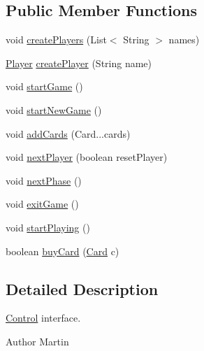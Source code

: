 \subsection*{\-Public \-Member \-Functions}
\begin{DoxyCompactItemize}
\item 
void \hyperlink{interfacedominion_1_1control_1_1Control_ab56d2c677d28c1057d778e8c612fca32}{create\-Players} (\-List$<$ \-String $>$ names)
\item 
\hyperlink{interfacedominion_1_1model_1_1Player}{\-Player} \hyperlink{interfacedominion_1_1control_1_1Control_aba420bb2b223beb828a7bcf1158abc57}{create\-Player} (\-String name)
\item 
void \hyperlink{interfacedominion_1_1control_1_1Control_a4ce0cf943175932b2b2e0df91cb55307}{start\-Game} ()
\item 
void \hyperlink{interfacedominion_1_1control_1_1Control_a8d3da0166736b7f786925d6cdca56ec0}{start\-New\-Game} ()
\item 
void \hyperlink{interfacedominion_1_1control_1_1Control_af4dd1bfacfdbd6c4d9b60aed99f515e3}{add\-Cards} (\-Card...\-cards)
\item 
void \hyperlink{interfacedominion_1_1control_1_1Control_a897322aa99b10418425b5ce0f799d17e}{next\-Player} (boolean reset\-Player)
\item 
void \hyperlink{interfacedominion_1_1control_1_1Control_a630ad524600d28db3b01c0cc3407c9f9}{next\-Phase} ()
\item 
void \hyperlink{interfacedominion_1_1control_1_1Control_a7f51535a44addff1d895149be71b8c89}{exit\-Game} ()
\item 
void \hyperlink{interfacedominion_1_1control_1_1Control_aa98523f28b63d0b7d90b398a3a891594}{start\-Playing} ()
\item 
boolean \hyperlink{interfacedominion_1_1control_1_1Control_a71598562ac3a8ff3cb67bf968142f5f7}{buy\-Card} (\hyperlink{interfacedominion_1_1model_1_1cards_1_1Card}{\-Card} c)
\end{DoxyCompactItemize}


\subsection{\-Detailed \-Description}
\hyperlink{interfacedominion_1_1control_1_1Control}{\-Control} interface.

\begin{DoxyAuthor}{\-Author}
\-Martin 
\end{DoxyAuthor}


